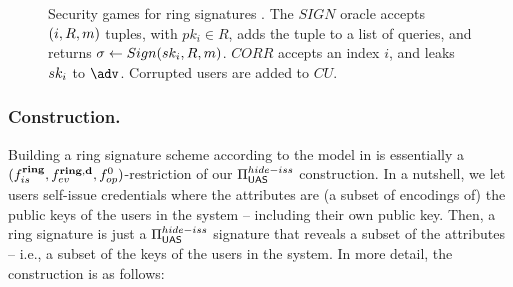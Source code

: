 \begin{figure}[ht!]
  \centering
  \caption{Security games for ring signatures \cite{bkm06}. The $SIGN$ oracle
    accepts $(i,R,m)$ tuples, with $pk_i \in R$, adds the tuple to a list of
    queries, and returns $\sigma \gets Sign(sk_i,R,m)$. $CORR$
    accepts an index $i$, and leaks $sk_i$ to $\adv$. Corrupted users are added
    to $CU$.}
  \label{fig:model-rs}  
\end{figure}


\subsubsection{\CUASRing Construction.} %
Building a ring signature scheme according to the model in 
is essentially a $(f_{is}^{\mathbf{ring}},f_{ev}^{\mathbf{ring},\mathbf{d}},f_{op}^0)$-restriction
of our $\Pi_{\mathsf{UAS}}^{hide-iss}$ construction. In a nutshell, we let users self-issue
credentials where the attributes are (a subset of encodings of) the public keys
of the users in the system -- including their own public key. Then, a ring
signature is just a $\Pi_{\mathsf{UAS}}^{hide-iss}$ signature that reveals a subset of
the attributes -- i.e., a subset of the keys of the users in the system. In more
detail, the construction is as follows:

